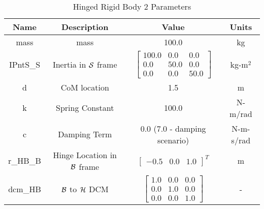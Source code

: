 \begin{table}[htbp]
	\caption{Hinged Rigid Body 2 Parameters}
	\label{tab:panel2}
	\centering \fontsize{10}{10}\selectfont
	\begin{tabular}{| c | c | c | c |} %
		\hline
		\textbf{Name}  & \textbf{Description}  & \textbf{Value} & \textbf{Units} \\
		\hline
		mass  & mass & 100.0 & kg \\
		\hline
		IPntS\_S & Inertia in $\cal{S}$ frame & $\begin{bmatrix}
		100.0 & 0.0 & 0.0\\
		0.0 & 50.0 & 0.0\\
		0.0 & 0.0 & 50.0
		\end{bmatrix}$ & kg-m$^2$ \\
		\hline
		d & CoM location & 1.5 & m \\
		\hline
		k & Spring Constant & 100.0 & N-m/rad \\
		\hline
		c & Damping Term & 0.0 (7.0 - damping scenario) & N-m-s/rad \\
		\hline
		r\_HB\_B & Hinge Location in $\cal{B}$ frame & $\begin{bmatrix}
		-0.5 & 0.0 & 1.0 \end{bmatrix}^T$ & m \\
		\hline
		dcm\_HB & $\cal{B}$ to $\cal{H}$ DCM & $\begin{bmatrix}
		1.0 & 0.0 & 0.0\\
		0.0 & 1.0 & 0.0\\
		0.0 & 0.0 & 1.0
		\end{bmatrix}$ & - \\
		\hline
	\end{tabular}
\end{table}

